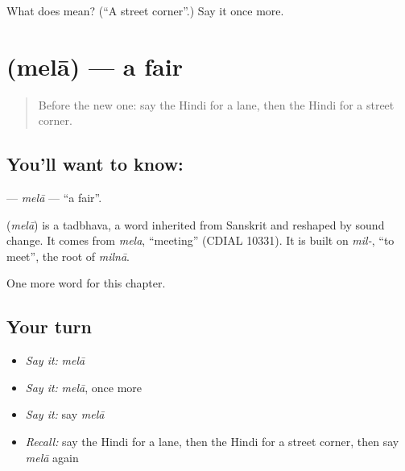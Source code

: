 \begin{tcolorbox}[breakable,colback=teal!4,colframe=teal!35!black,title={Before you move on}]
What does  mean? (\textquotedblleft{}A street corner\textquotedblright{}.) Say it once more.
\end{tcolorbox}
\section[\texorpdfstring{\hi{मेला} (melā)}{मेला (melā)}]{ (melā) — a fair}

\label{lesson:HI-C272-mela}



\begin{quote}
Before the new one: say the Hindi for a lane, then the Hindi for a street corner.
\end{quote}

\subsection*{You'll want to know: }
\textbf{} — \emph{melā} — \textquotedblleft{}a fair\textquotedblright{}.

\begin{cousinweb}
\textbf{} (\emph{melā}) is a tadbhava, a word inherited from Sanskrit and reshaped by sound change. It comes from \emph{mela}, \textquotedblleft{}meeting\textquotedblright{} (CDIAL 10331). It is built on \emph{mil-}, \textquotedblleft{}to meet\textquotedblright{}, the root of \emph{milnā}.
\end{cousinweb}

\begin{grammarlens}[title={What you've built}]
One more word for this chapter.
\end{grammarlens}

\subsection*{Your turn}
\begin{itemize}
\raggedright
  \item \emph{Say it:} \emph{melā}
  \item \emph{Say it:} \emph{melā}, once more
  \item \emph{Say it:} say \emph{melā}
  \item \emph{Recall:} say the Hindi for a lane, then the Hindi for a street corner, then say \emph{melā} again
\end{itemize}

